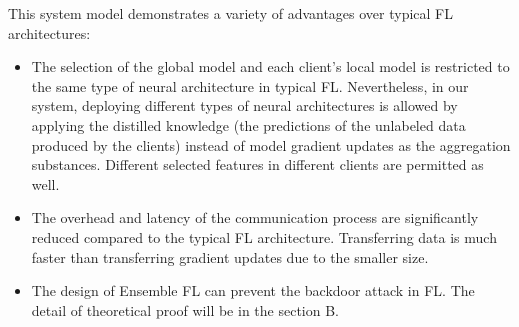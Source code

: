\documentclass[journal]{IEEEtran}
\begin{document}
\par This system model demonstrates a variety of advantages over typical FL architectures:
\begin{itemize}

  \item The selection of the global model and each client's local model is restricted to the same type of neural architecture in typical FL. Nevertheless, in our system, deploying different types of neural architectures is allowed by applying the distilled knowledge (the predictions of the unlabeled data produced by the clients) instead of model gradient updates as the aggregation substances. Different selected features in different clients are permitted as well.
  \item The overhead and latency of the communication process are significantly reduced compared to the typical FL architecture. Transferring data is much faster than transferring gradient updates due to the smaller size. 
  \item The design of Ensemble FL can prevent the backdoor attack in FL. The detail of theoretical proof will be in the section B.
\end{itemize}
      
\end{document}
